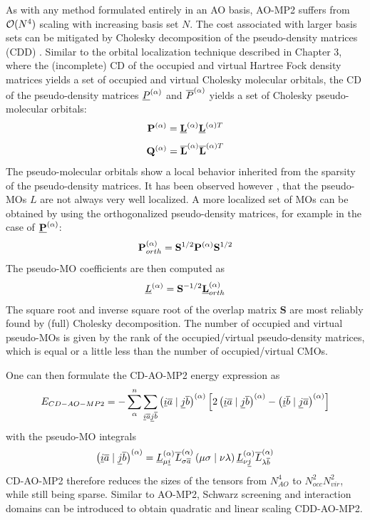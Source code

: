 As with any method formulated entirely in an AO basis, AO-MP2 suffers from $\mathcal{O}(N^{4})$ scaling with increasing basis set $N$. The cost associated with larger basis sets can be mitigated by Cholesky decomposition of the pseudo-density matrices (CDD) \cite{Zie2009}. Similar to the orbital localization technique described in Chapter 3, where the (incomplete) CD of the occupied and virtual Hartree Fock density matrices yields a set of occupied and virtual Cholesky molecular orbitals, the CD of the pseudo-density matrices $\underline{P}^{(\alpha)}$ and $\overline{P}^{(\alpha)}$ yields a set of Cholesky pseudo-molecular orbitals: 
\begin{equation}
\mathbf{P}^{(\alpha)} = \mathbf{\underline{L}}^{(\alpha)} \mathbf{\underline{L}}^{(\alpha)T}
\end{equation}
\begin{equation}
\mathbf{Q}^{(\alpha)} = \mathbf{\overline{L}}^{(\alpha)} \mathbf{\overline{L}}^{(\alpha)T}
\end{equation} 
\noindent The pseudo-molecular orbitals show a local behavior inherited from the sparsity of the pseudo-density matrices. It has been observed however \cite{Lue2017}, that the pseudo-MOs $L$ are not always very well localized. A more localized set of MOs can be obtained by using the orthogonalized pseudo-density matrices, for example in the case of $\mathbf{\underline{P}}^{(\alpha)}$:
\begin{equation}
\mathbf{P}^{(\alpha)}_{orth} = \mathbf{S}^{1/2} \mathbf{P}^{(\alpha)} \mathbf{S}^{1/2}
\end{equation}
\noindent The pseudo-MO coefficients are then computed as
\begin{equation}
\underline{L}^{(\alpha)} = \mathbf{S}^{-1/2} \mathbf{\underline{L}}^{(\alpha)}_{orth}
\end{equation}
\noindent The square root and inverse square root of the overlap matrix $\mathbf{S}$ are most reliably found by (full) Cholesky decomposition. The number of occupied and virtual pseudo-MOs is given by the rank of the occupied/virtual pseudo-density matrices, which is equal or a little less than the number of occupied/virtual CMOs. 

One can then formulate the CD-AO-MP2 energy expression as
\begin{equation}
E_{CD-AO-MP2} = - \sum_{\alpha}^n \sum_{\underline{i}\overline{a}\underline{j}\overline{b}} \left( \underline{i}\overline{a} \mid \underline{j}\overline{b} \right)^{(\alpha)} \left [ 2\left( \underline{i}\overline{a} \mid \underline{j}\overline{b} \right)^{(\alpha)} -  \left( \underline{i}\overline{b} \mid \underline{j}\overline{a} \right)^{(\alpha)} \right]
\end{equation}
\noindent with the pseudo-MO integrals
\begin{equation}
\left( \underline{i}\overline{a} \mid \underline{j}\overline{b} \right)^{(\alpha)} = \underline{L}^{(\alpha)}_{\mu\underline{i}} \overline{L}^{(\alpha)}_{\sigma\overline{a}} \left( \mu\sigma \mid \nu\lambda \right) \underline{L}^{(\alpha)}_{\nu\underline{j}} \overline{L}^{(\alpha)}_{\lambda\overline{b}}
\end{equation}
\noindent CD-AO-MP2 therefore reduces the sizes of the tensors from $N^{4}_{AO}$ to $N_{occ}^2N_{vir}^2$, while still being sparse. Similar to AO-MP2, Schwarz screening and interaction domains can be introduced to obtain quadratic and linear scaling CDD-AO-MP2.

